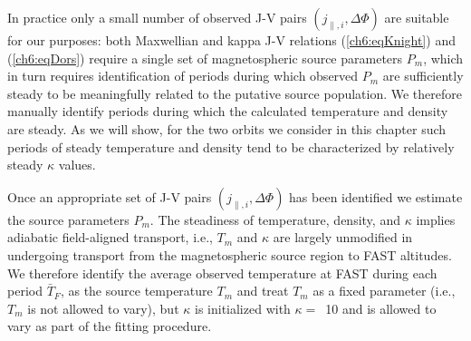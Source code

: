   In practice only a small number of observed J-V pairs
  $( j_{\parallel,i} , \Delta \Phi )$ are suitable for our purposes: both
  Maxwellian and kappa J-V relations (\ref{ch6:eqKnight}) and (\ref{ch6:eqDors})
  require a single set of magnetospheric source parameters $P_m$, which in turn
  requires identification of periods during which observed $P_m$ are
  sufficiently steady to be meaningfully related to the putative source
  population. We therefore manually identify periods during which the calculated
  temperature and density are steady. As we will show, for the two orbits we
  consider in this chapter such periods of steady temperature and density tend
  to be characterized by relatively steady $\kappa$ values.

  Once an appropriate set of J-V pairs $( j_{\parallel,i} , \Delta \Phi )$ has
  been identified we estimate the source parameters $P_m$. The steadiness of
  temperature, density, and $\kappa$ implies adiabatic field-aligned transport,
  i.e., $T_m$ and $\kappa$ are largely unmodified in undergoing transport from
  the magnetospheric source region to FAST altitudes. We therefore identify the
  average observed temperature at FAST during each period $\bar{T}_F$, as the
  source temperature $T_m$ and treat $T_m$ as a fixed parameter (i.e., $T_m$ is
  not allowed to vary), but $\kappa$ is initialized with $\kappa =$~10 and is
  allowed to vary as part of the fitting procedure.

